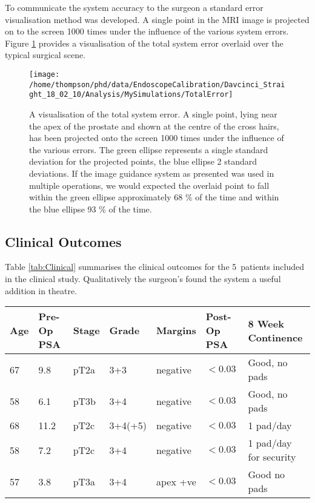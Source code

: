 \documentclass[3p,twocolumn,preprint,10pt]{elsarticle}
\newcommand{\n}{5}
\begin{document}
To communicate the system accuracy to the surgeon a standard error
visualisation method was developed. A single point in the MRI image is projected 
on to the screen 1000 times under the influence of the various system errors. 
Figure \ref{fig:SystemError} provides a visualisation 
of the total system error overlaid over the typical surgical scene.

\begin{figure}
\begin{center}
\texttt{[image: /home/thompson/phd/data/EndoscopeCalibration/Davcinci\_Straight\_18\_02\_10/Analysis/MySimulations/TotalError]}
\end{center}
\caption{\label{fig:SystemError}A visualisation of the total system error. A single point,
lying near the apex of the prostate and shown at the centre of the cross hairs, has been 
projected onto the screen 1000 times under the influence of the various errors. The green 
ellipse represents a single standard deviation for the projected points, the blue 
ellipse 2 standard deviations. If the image guidance system as presented was used
in multiple operations, we would expected the overlaid point to fall within the green ellipse
approximately 68 \% of the time and within the blue ellipse 93 \% of the time.}
\end{figure}

\subsection{Clinical Outcomes}
Table \ref{tab:Clinical} summarises the clinical outcomes for the \n \ patients 
included in the clinical study. Qualitatively the surgeon's found the system 
a useful addition in theatre.
\begin{table*}
\begin{tabular}{|p{}|p{}|p{}|p{}|p{}|p{}|p{}|} \hline
Age & Pre-Op PSA & Stage & Grade & Margins & Post-Op PSA & 8 Week Continence \\ \hline
67 & 9.8 & pT2a & 3+3 & negative & $< 0.03$ & Good, no pads \\
58 & 6.1 & pT3b & 3+4 & negative &  $< 0.03$ & Good, no pads \\
68 & 11.2 & pT2c & 3+4(+5) & negative &  $< 0.03$ & 1 pad/day  \\
58 & 7.2 & pT2c & 3+4 & negative &  $< 0.03$ & 1 pad/day for security \\
57 & 3.8 & pT3a & 3+4 & apex +ve & $< 0.03$ & Good no pads \\ \hline
\end{tabular}
\caption{\label{tab:Clinical}Clinical outcomes for the five patients. There
is no reason to expect that the system as implemented would have affected clinical outcomes.}
\end{table*}
\end{document}
